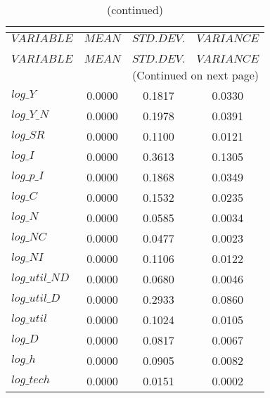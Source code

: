  
\begin{center}
\begin{longtable}{lccc} 
\caption{THEORETICAL MOMENTS}\\
 \label{Table:th_moments}\\
\toprule 
$VARIABLE       $	 & 	 $         MEAN$	 & 	 $    STD. DEV.$	 & 	 $     VARIANCE$\\
\midrule \endfirsthead 
\caption{(continued)}\\
 \toprule \\ 
$VARIABLE       $	 & 	 $         MEAN$	 & 	 $    STD. DEV.$	 & 	 $     VARIANCE$\\
\midrule \endhead 
\midrule \multicolumn{4}{r}{(Continued on next page)} \\ \bottomrule \endfoot 
\bottomrule \endlastfoot 
$log\_Y         $	 & 	       0.0000	 & 	       0.1817	 & 	       0.0330 \\ 
$log\_Y\_N      $	 & 	       0.0000	 & 	       0.1978	 & 	       0.0391 \\ 
$log\_SR        $	 & 	       0.0000	 & 	       0.1100	 & 	       0.0121 \\ 
$log\_I         $	 & 	       0.0000	 & 	       0.3613	 & 	       0.1305 \\ 
$log\_p\_I      $	 & 	       0.0000	 & 	       0.1868	 & 	       0.0349 \\ 
$log\_C         $	 & 	       0.0000	 & 	       0.1532	 & 	       0.0235 \\ 
$log\_N         $	 & 	       0.0000	 & 	       0.0585	 & 	       0.0034 \\ 
$log\_NC        $	 & 	       0.0000	 & 	       0.0477	 & 	       0.0023 \\ 
$log\_NI        $	 & 	       0.0000	 & 	       0.1106	 & 	       0.0122 \\ 
$log\_util\_ND  $	 & 	       0.0000	 & 	       0.0680	 & 	       0.0046 \\ 
$log\_util\_D   $	 & 	       0.0000	 & 	       0.2933	 & 	       0.0860 \\ 
$log\_util      $	 & 	       0.0000	 & 	       0.1024	 & 	       0.0105 \\ 
$log\_D         $	 & 	       0.0000	 & 	       0.0817	 & 	       0.0067 \\ 
$log\_h         $	 & 	       0.0000	 & 	       0.0905	 & 	       0.0082 \\ 
$log\_tech      $	 & 	       0.0000	 & 	       0.0151	 & 	       0.0002 \\ 
\end{longtable}
 \end{center}
